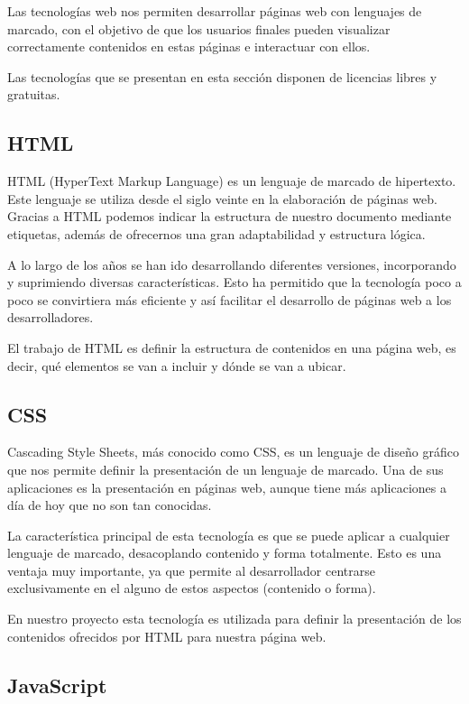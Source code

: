\documentclass[a4paper, 12pt]{book}
\begin{document}
Las tecnologías web nos permiten desarrollar páginas web con lenguajes de marcado,
con el objetivo de que los usuarios finales pueden visualizar correctamente
contenidos en estas páginas e interactuar con ellos.

Las tecnologías que se presentan en esta sección disponen de
licencias libres y gratuitas.

\subsection{HTML}
\label{subsec:html}

HTML (HyperText Markup Language) es un lenguaje de marcado de hipertexto.
Este lenguaje se utiliza desde el siglo veinte en la elaboración de páginas web.
Gracias a HTML podemos indicar la estructura de nuestro documento mediante
etiquetas, además de ofrecernos una gran adaptabilidad y estructura
lógica.

A lo largo de los años se han ido desarrollando diferentes versiones,
incorporando y suprimiendo diversas características. Esto ha permitido
que la tecnología poco a poco se convirtiera más eficiente y así
facilitar el desarrollo de páginas web a los desarrolladores.

El trabajo de HTML es definir la estructura de contenidos en una página web,
es decir, qué elementos se van a incluir y dónde se van a ubicar.

\subsection{CSS}
\label{subsec:css}

Cascading Style Sheets, más conocido como CSS, es un lenguaje de diseño
gráfico que nos permite definir la presentación de un lenguaje de marcado.
Una de sus aplicaciones es la presentación en páginas web, aunque tiene
más aplicaciones a día de hoy que no son tan conocidas.

La característica principal de esta tecnología es que se puede aplicar a
cualquier lenguaje de marcado, desacoplando contenido y forma totalmente.
Esto es una ventaja muy importante, ya que permite al desarrollador centrarse
exclusivamente en el alguno de estos aspectos (contenido o forma).

En nuestro proyecto esta tecnología es utilizada para definir la presentación
de los contenidos ofrecidos por HTML para nuestra página web.

\subsection{JavaScript}
\label{subsec:javascript}
\end{document}
